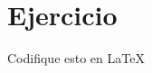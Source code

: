 \section{Ejercicio}

\begin{frame}
	\begin{block}{Codifique esto en \LaTeX}\end{block}
\end{frame}

\begin{frame}%
	\begin{solution}\inputminted[fontsize=\tiny,linenos,frame=single]{latex}{sections/solution3}\end{solution}
\end{frame}
